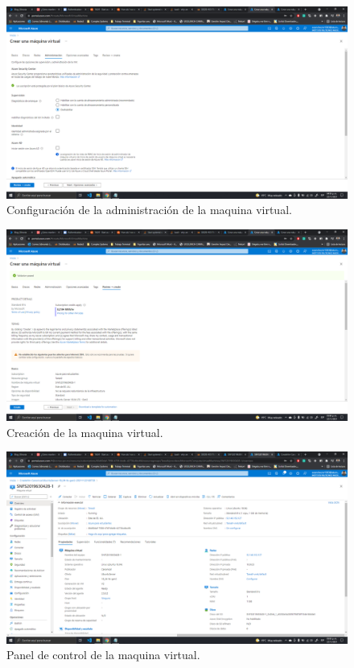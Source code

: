 \documentclass[11pt]{article}
\begin{document}
		\begin{figure}[H]
			\centering
			\includegraphics[scale=0.34]{resources/admin1.png}
			\caption{Configuración de la administración de la maquina virtual.}\label{fig:picture}
		\end{figure}
		\begin{figure}[H]
			\centering
			\includegraphics[scale=0.34]{resources/revisarycrear1.png}
			\caption{Creación de la maquina virtual.}\label{fig:picture}
		\end{figure}
		\begin{figure}[H]
			\centering
			\includegraphics[scale=0.34]{resources/paneldecontrol1.png}
			\caption{Panel de control de la maquina virtual.}\label{fig:picture}
		\end{figure}
		
\end{document}

